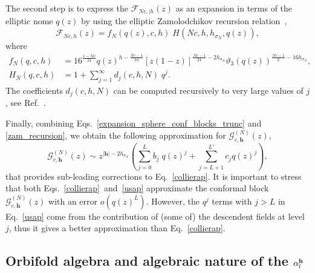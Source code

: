 \documentclass[a4paper,11pt]{article}
\begin{document}
The second step is to express the $\mathcal{F}_{N c, |h }(z)$ as an expansion in terms of the elliptic nome $q(z)$ by using the elliptic Zamolodchikov recursion relation~\cite{Zamolodchikov2},
\begin{equation}\label{zam_recursion}
 \mathcal{F}_{Nc, h}(z)=
 f_N(q(z), c, h) \;H(Nc, h, h_{\sigma_N}, q(z)),
\end{equation}
where
\begin{align}
f_N(q, c, h) &= 16^{\frac{1-Nc}{24}}q(z)^{h-\frac{Nc-1}{24}}
 [z(1-z)]^{\frac{Nc-1}{24}-2h_{\sigma_N}}
 \vartheta_3(q(z))^{\frac{Nc-1}{2}-16h_{\sigma_N}}, \\
 H_N(q, c, h)&=1+\sum_{j=1}^{\infty}d_j(c, h,N)\;q^j.
\end{align}
The coefficients $d_j(c, h,N) $ can be computed recursively to very large values of $j$, see Ref.~\cite{Zamolodchikov2}. 

Finally, combining Eqs.~\eqref{expansion_sphere_conf_blocks_trunc} and \eqref{zam_recursion}, we obtain the following approximation 
for $\mathcal{G}_{c, \boldsymbol{h}}^{(N)}(z)$, 
\begin{equation}
\label{usap}
\mathcal{G}_{c,\boldsymbol{h}}^{(N)}(z) \sim z^{|\boldsymbol{h}|-2h_{\sigma_N}} \left(\sum_{j=0}^{L} b_j \; q(z)^j+\sum_{j=L+1}^{L'} c_j q(z)^{j}\right), 
\end{equation}
that provides sub-leading corrections to Eq.~\eqref{collierap}. It is important to stress that both Eqs.~\eqref{collierap}~and~\eqref{usap} approximate the conformal block $ \mathcal{G}_{c,\boldsymbol{h}}^{(N)}(z)$ with an error $o(q(z)^{L})$. However, the $q^j$ terms with $j>L$  in Eq.~\eqref{usap} come from the contribution of (some of) the descendent fields at level $j$, thus it gives a better approximation than Eq.~\eqref{collierap}.  

\subsection{Orbifold algebra and algebraic nature of the $\alpha_{l}^{{\bf h}}$}\label{deralpha}
\end{document}
